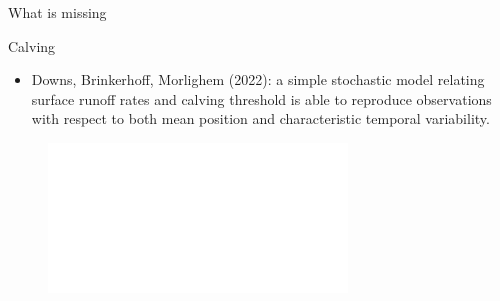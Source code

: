 \documentclass[hide notes,intlimits]{beamer}
\begin{document}
\begin{frame}{What is missing}
      \begin{minipage}[t][.9\textheight][t]{.9\textwidth}
  \begin{block}{Calving}
    \begin{itemize}
    \item Downs, Brinkerhoff, Morlighem (2022): 
a simple stochastic model relating surface runoff rates and calving threshold is able to reproduce observations with respect to both mean position and characteristic temporal variability.    \end{itemize}
      \begin{figure}
        \includegraphics<2->[width=.9\textwidth]{jib-runoff-1980-2020.pdf}
      \end{figure}
  \end{block}

      \end{minipage}
\end{frame}


  {
}

\begin{frame}[plain]
  \begin{figure}
\end{figure}
\end{frame}
\end{document}
